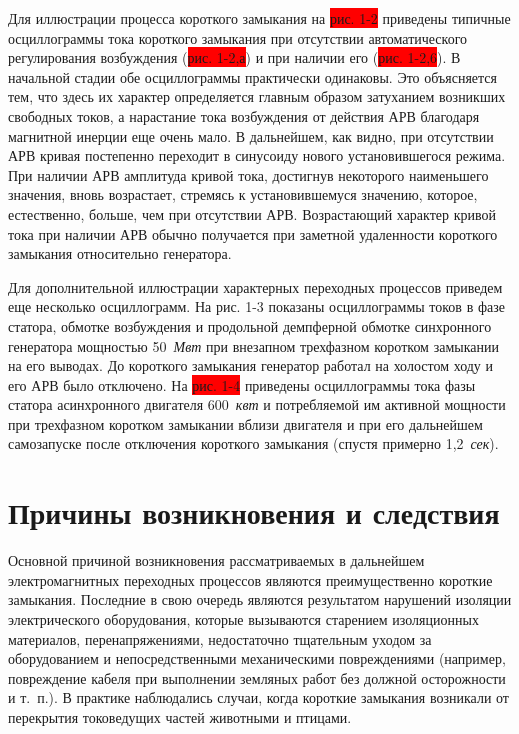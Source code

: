 Для иллюстрации процесса короткого замыкания на \colorbox{red}{рис. 1-2} приведены типичные осциллограммы тока короткого замыкания при отсутствии автоматического регулирования возбуждения (\colorbox{red}{рис. 1-2,а}) и при наличии его (\colorbox{red}{рис. 1-2,6}). В начальной стадии обе осциллограммы практически одинаковы. Это объясняется тем, что здесь их характер определяется главным образом затуханием возникших свободных токов, а нарастание тока возбуждения от действия АРВ благодаря магнитной инерции еще очень мало. В дальнейшем, как видно, при отсутствии АРВ кривая постепенно переходит в синусоиду нового установившегося режима. При наличии АРВ амплитуда кривой тока, достигнув некоторого наименьшего значения, вновь возрастает, стремясь к установившемуся значению, которое, естественно, больше, чем при отсутствии АРВ. Возрастающий характер кривой тока при наличии АРВ обычно получается при заметной удаленности короткого замыкания относительно генератора.

Для дополнительной иллюстрации характерных переходных процессов приведем еще несколько осциллограмм. На рис. 1-3 показаны осциллограммы токов в фазе статора, обмотке возбуждения и продольной демпферной обмотке синхронного генератора мощностью 50~\textit{Мвт} при внезапном трехфазном коротком замыкании на его выводах. До короткого замыкания генератор работал на холостом ходу и его АРВ было отключено. На \colorbox{red}{рис. 1-4} приведены осциллограммы тока фазы статора асинхронного двигателя 600~\textit{квт} и потребляемой им активной мощности при трехфазном коротком замыкании вблизи двигателя и при его дальнейшем самозапуске после отключения короткого замыкания (спустя примерно 1,2~\textit{сек}).

\section{Причины возникновения и следствия}

Основной причиной возникновения рассматриваемых в дальнейшем электромагнитных переходных процессов являются преимущественно короткие замыкания. Последние в свою очередь являются результатом нарушений изоляции электрического оборудования, которые вызываются старением изоляционных материалов, перенапряжениями, недостаточно тщательным уходом за оборудованием и непосредственными механическими повреждениями (например, повреждение кабеля при выполнении земляных работ без должной осторожности и т.~п.). В практике наблюдались случаи, когда короткие замыкания возникали от перекрытия токоведущих частей животными и птицами.

